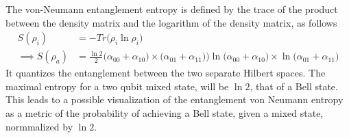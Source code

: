 The von-Neumann entanglement entropy is defined by the trace of the product between the density matrix and the logarithm of the density matrix, as follows
\begin{align}
    S(\rho_i) &= - Tr\Big(\rho_i \ln \rho_i\Big) \\
    \implies S(\rho_a)& = \frac{\ln2}{2}\Big(\alpha_{00}+\alpha_{10}\big) \times \big(\alpha_{01}+\alpha_{11}\big)\Big) \ln\big(\alpha_{00}+\alpha_{10}\big) \times\ln \big(\alpha_{01}+\alpha_{11}\big)
\end{align}
It quantizes the entanglement between the two separate Hilbert spaces. The maximal entropy for a two qubit mixed state, will be $\ln 2$, that of a Bell state. This leads to a possible visualization of the entanglement von Neumann entropy as a metric of the probability of achieving a Bell state, given a mixed state, normmalized by $\ln 2$.
